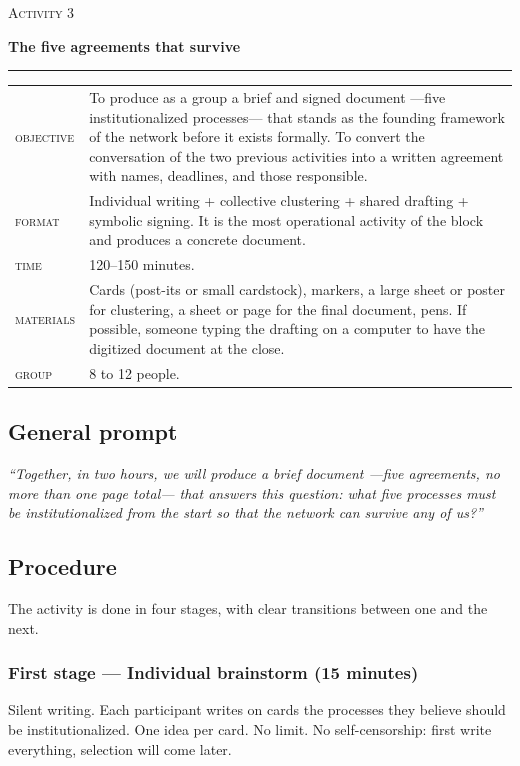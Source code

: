 \documentclass[11pt, a4paper]{article}
\newcommand{\etiqueta}[1]{\textcolor{organizacionVerde}{\scshape #1}}
\newcommand{\tituloActividad}[2]{%
  {\color{tenue}\scshape\normalsize Activity #1}\par
  \vspace{0.15em}
  {\color{organizacionVerde}\LARGE\bfseries #2}\par
  \vspace{0.3em}
  {\color{regla}\rule{\linewidth}{0.4pt}}\par
  \vspace{0.5em}
}
\begin{document}
\newpage

\begin{actividad}
\tituloActividad{3}{The five agreements that survive}

\begin{ficha}
\begin{tabular}{@{}p{6em}@{\hspace{1em}}p{\dimexpr\linewidth-7.6em}@{}}
  \etiqueta{objective}  & To produce as a group a brief and signed document ---five institutionalized processes--- that stands as the founding framework of the network before it exists formally. To convert the conversation of the two previous activities into a written agreement with names, deadlines, and those responsible. \\[0.35em]
  \etiqueta{format}     & Individual writing + collective clustering + shared drafting + symbolic signing. It is the most operational activity of the block and produces a concrete document. \\[0.35em]
  \etiqueta{time}       & 120--150 minutes. \\[0.35em]
  \etiqueta{materials}  & Cards (post-its or small cardstock), markers, a large sheet or poster for clustering, a sheet or page for the final document, pens. If possible, someone typing the drafting on a computer to have the digitized document at the close. \\[0.35em]
  \etiqueta{group}      & 8 to 12 people.
\end{tabular}
\end{ficha}

\subsection*{General prompt}
\emph{``Together, in two hours, we will produce a brief document ---five agreements, no more than one page total--- that answers this question: what five processes must be institutionalized from the start so that the network can survive any of us?''}

\subsection*{Procedure}
The activity is done in four stages, with clear transitions between one and the next.

\subsubsection*{First stage --- Individual brainstorm (15 minutes)}
Silent writing. Each participant writes on cards the processes they believe should be institutionalized. One idea per card. No limit. No self-censorship: first write everything, selection will come later.


\end{actividad}
\end{document}
